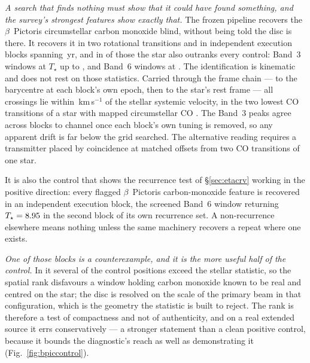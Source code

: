 \emph{A search that finds nothing must show that it could have found
something, and the survey's strongest features show exactly that.} The
frozen pipeline recovers the $\beta$~Pictoris circumstellar carbon monoxide
blind, without being told the disc is there. It recovers it in two
rotational transitions and in \CsBpCoBlocks{} independent execution
blocks spanning \BpBaselineYr\,yr, and in \NStageOneBpicEb{} of those the
star also outranks every control: \BpicNFlagThree{} Band~3 windows at
$T_\star$ up to \BpicBThreeTsym, and \BpicNFlagSix{} Band~6 windows at
\BpicBSixTsym. The identification is kinematic and does not rest on those
statistics. Carried through the frame chain --- to the barycentre at each
block's own epoch, then to the star's rest frame --- all \BpicPanelNCo{}
crossings lie within \BpicDvCoHi\,km\,s$^{-1}$ of the stellar systemic
velocity, in the two lowest CO transitions of a star with mapped
circumstellar CO \citep{Dent2014,Matra2017}. The Band~3 peaks agree across blocks to
\BpRecThreeTuneChanMax{} channel once each block's own tuning is removed, so
any apparent drift is far below the grid searched. The alternative reading
requires a transmitter placed by coincidence at matched offsets from two CO
transitions of one star.

It is also the control that shows the recurrence test of
\S\ref{sec:etacrv} working in the positive direction: every flagged
$\beta$~Pictoris carbon-monoxide feature is recovered in an independent
execution block, the screened Band~6 window returning
$T_\star=8.95{}$ in the second block of its own recurrence set. A
non-recurrence elsewhere means nothing unless the same machinery recovers a
repeat where one exists.

\emph{One of those blocks is a counterexample, and it is the more useful half
of the control.} In it several of the \NCtrl{} control positions exceed the
stellar statistic, so the spatial rank disfavours a window holding carbon
monoxide known to be real and centred on the star; the disc is resolved on
the scale of the primary beam in that configuration, which is the geometry
the statistic is built to reject. The rank is therefore a test of
compactness and not of authenticity, and on a real extended source it errs
conservatively --- a stronger statement than a clean positive control, because
it bounds the diagnostic's reach as well as demonstrating it
(Fig.~\ref{fig:bpiccontrol}).



